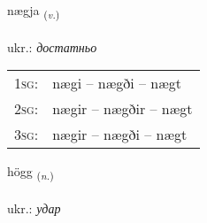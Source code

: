 \documentclass[frontgrid, backgrid]{flacards}\usepackage[]{graphicx}\usepackage[]{xcolor}
\begin{document}
\renewcommand{\blhead}{\vskip5pt {\small\bfseries\footnotesize Sagnorð | дієслово }}
\renewcommand{\bcfoot}{\vskip5pt \hspace{2pt}{\small\bfseries\footnotesize 2K}}


{nægja \small{\textsubscript{(\textit{v.})}} \\[1ex] %
\textphonetic{[naiːja]} \\
ukr.: \emph{достатньо} \\  [2ex]
\renewcommand*{\arraystretch}{0.8}
\begin{tabular}{p{1cm}l}
\textsc{1sg}: & nægi -- nægði -- nægt \\ 
\textsc{2sg}: & nægir -- nægðir -- nægt \\ 
\textsc{3sg}: & nægir -- nægði -- nægt \\ 
\end{tabular}
}

\renewcommand{\flhead}{\vskip5pt \fboxsep=0pt {\small\bfseries\footnotesize Nafnorð | іменник}}
\renewcommand{\fcfoot}{\vskip5pt \fboxsep=0pt \hspace{2pt}{\small\bfseries\footnotesize 2K}}

\renewcommand{\blhead}{\vskip5pt {\small\bfseries\footnotesize Nafnorð | іменник }}
\renewcommand{\bcfoot}{\vskip5pt \hspace{2pt}{\small\bfseries\footnotesize 2K}}


{högg \small{\textsubscript{(\textit{n.})}} \\[1ex] %
\textphonetic{[hœk]} \\
ukr.: \emph{удар} \\  [2ex]
\renewcommand*{\arraystretch}{0.8}
}

\renewcommand{\flhead}{\vskip5pt \fboxsep=0pt {\small\bfseries\footnotesize Nafnorð | іменник}}
\renewcommand{\fcfoot}{\vskip5pt \fboxsep=0pt \hspace{2pt}{\small\bfseries\footnotesize 2K}}
\end{document}
